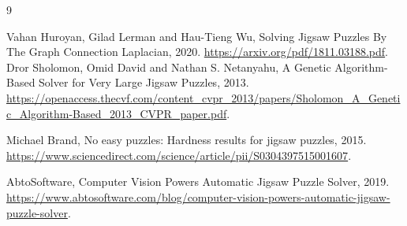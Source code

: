 \documentclass[epsfig,a4paper,11pt,titlepage,twoside,openany]{article}
\begin{document}
\cleardoublepage
\clearpage
\begin{thebibliography}{9}

    Vahan Huroyan, Gilad   Lerman and Hau-Tieng Wu,
    Solving Jigsaw Puzzles By The Graph Connection Laplacian,
    2020.
    \url{https://arxiv.org/pdf/1811.03188.pdf}.
    Dror Sholomon, Omid David and Nathan S. Netanyahu,
    A Genetic Algorithm-Based Solver for Very Large Jigsaw Puzzles,
    2013.
    \url{https://openaccess.thecvf.com/content_cvpr_2013/papers/Sholomon_A_Genetic_Algorithm-Based_2013_CVPR_paper.pdf}.
  
    Michael Brand,
    No easy puzzles: Hardness results for jigsaw puzzles,
    2015.
    \url{https://www.sciencedirect.com/science/article/pii/S0304397515001607}.

    AbtoSoftware,
    Computer Vision Powers Automatic Jigsaw Puzzle Solver,
    2019.
    \url{https://www.abtosoftware.com/blog/computer-vision-powers-automatic-jigsaw-puzzle-solver}.
  
\end{thebibliography}
\end{document}
